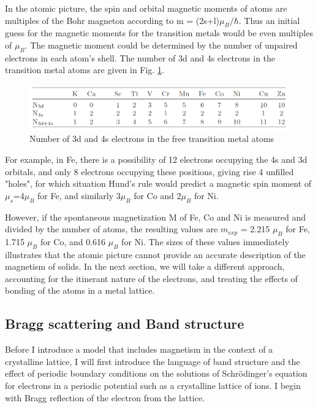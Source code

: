 In the atomic picture, the spin and orbital magnetic moments of atoms are multiples of the Bohr magneton according to m = (2s+l)$\mu_B/\hbar$. Thus an initial guess for the magnetic moments for the transition metals would be even multiples of $\mu_B$. The magnetic moment could be determined by the number of unpaired electrons in each atom's shell. The number of 3d and 4s electrons in the transition metal atoms are given in Fig. \ref{TransMetalUnpE}.

\begin{figure}
	\begin{center}
		\includegraphics[width=150mm]{figs/TransitionMetalValenceShells}
	\end{center}
\caption{Number of 3d and 4s electrons in the free transition metal atoms}
\label{TransMetalUnpE}
\end{figure}

For example, in Fe, there is a possibility of 12 electrons occupying the 4s and 3d orbitals, and only 8 electrons occupying these positions, giving rise 4 unfilled "holes", for which situation Hund's rule would predict a magnetic spin moment of $\mu_s$=4$\mu_B$ for Fe, and similarly 3$\mu_B$ for Co and 2$\mu_B$ for Ni.

However, if the spontaneous magnetization M of Fe, Co and Ni is measured and divided by the number of atoms, the resulting values are $m_{exp}$ = 2.215 $\mu_B$ for Fe, 1.715 $\mu_B$ for Co, and 0.616 $\mu_B$ for Ni. The sizes of these values immediately illustrates that the atomic picture cannot provide an accurate description of the magnetism of solids. In the next section, we will take a different approach, accounting for the itinerant nature of the electrons, and treating the effects of bonding of the atoms in a metal lattice.

\subsection{Bragg scattering and Band structure}
\label{braggscatt}
Before I introduce a model that includes magnetism in the context of a crystalline lattice, I will first introduce the language of band structure and the effect of periodic boundary conditions on the solutions of Schr\"odinger's equation for electrons in a periodic potential such as a crystalline lattice of ions. I begin with Bragg reflection of the electron from the lattice.

